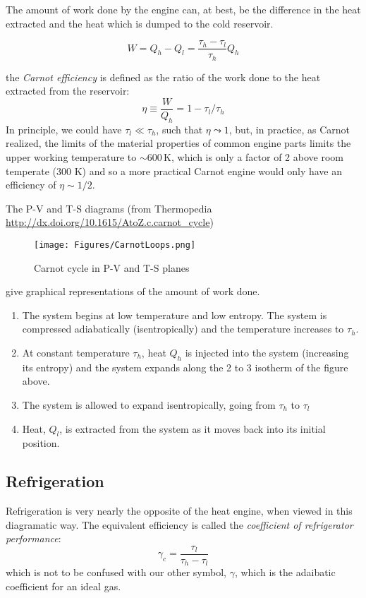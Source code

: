 The amount of work done by the engine can, at best, be the difference in the heat extracted and the heat which is dumped to the cold reservoir.

\begin{equation}
W = Q_h - Q_l = \frac{\tau_h - \tau_l}{\tau_h} Q_h
\end{equation}

the \textit{Carnot efficiency} is defined as the ratio of the work done to the heat extracted from the reservoir:
\begin{equation}
\eta \equiv \frac{W}{Q_h} = 1 - \tau_l/\tau_h
\end{equation}
In principle, we could have $\tau_l \ll \tau_h$, such that $\eta \leadsto 1$, but, in practice, as Carnot realized, the limits of the material properties of common engine parts limits the upper working temperature to $\sim$600\,K, which is only a factor of 2 above room temperate (300 K) and so a more practical Carnot engine would only have an efficiency of $\eta \sim 1/2$.


The P-V and T-S diagrams (from Thermopedia \url{http://dx.doi.org/10.1615/AtoZ.c.carnot_cycle})
\begin{figure}[h]
\centering
\texttt{[image: Figures/CarnotLoops.png]}
\caption{Carnot cycle in P-V and T-S planes}
\end{figure}
give graphical representations of the amount of work done.

\begin{enumerate}
\item The system begins at low temperature and low entropy. The system 
	is compressed adiabatically (isentropically) and the temperature 
	increases to $\tau_h$.

\item At constant temperature $\tau_h$, heat $Q_h$ is injected into the 
	system (increasing its entropy) and the system expands along the 
	2 to 3 isotherm of the figure above.

\item The system is allowed to expand isentropically, going from $\tau_h$ to $\tau_l$

\item Heat, $Q_l$, is extracted from the system as it moves back 
	into its initial position.
\end{enumerate}



\subsection{Refrigeration}
Refrigeration is very nearly the opposite of the heat engine, when viewed in this diagramatic way. The equivalent efficiency is called the \emph{coefficient of refrigerator performance}:
\begin{equation}
\gamma_c = \frac{\tau_l}{\tau_h - \tau_l}
\end{equation}
which is not to be confused with our other symbol, $\gamma$, which is the adaibatic coefficient for an ideal gas.

